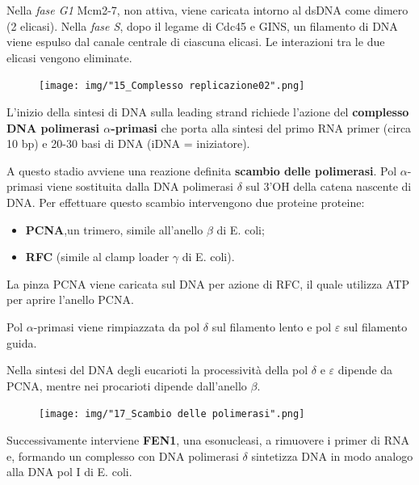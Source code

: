 \documentclass[11pt]{book}
\begin{document}
Nella \emph{fase G1} Mcm2-7, non attiva, viene caricata intorno al dsDNA
come dimero (2 elicasi). Nella \emph{fase S}, dopo il legame di Cdc45 e
GINS, un filamento di DNA viene espulso dal canale centrale di ciascuna
elicasi. Le interazioni tra le due elicasi vengono eliminate.

\begin{figure}[htp]
\centering
\texttt{[image: img/"15\_Complesso replicazione02".png]}
\caption{}
\label{complesso-replicazione02}
\end{figure}

L'inizio della sintesi di DNA sulla leading strand richiede l'azione del
\textbf{complesso DNA polimerasi \(\alpha\)-primasi} che porta alla
sintesi del primo RNA primer (circa 10 bp) e 20-30 basi di DNA (iDNA =
iniziatore).

A questo stadio avviene una reazione definita \textbf{scambio delle
polimerasi}. Pol \(\alpha\)-primasi viene sostituita dalla DNA
polimerasi \(\delta\) sul 3'OH della catena nascente di DNA. Per
effettuare questo scambio intervengono due proteine proteine:

\begin{itemize}
\itemsep1pt\parskip0pt
\item
  \textbf{PCNA},un trimero, simile all'anello \(\beta\) di E. coli;
\item
  \textbf{RFC} (simile al clamp loader \(\gamma\) di E. coli).
\end{itemize}

La pinza PCNA viene caricata sul DNA per azione di RFC, il quale
utilizza ATP per aprire l'anello PCNA.

Pol \(\alpha\)-primasi viene rimpiazzata da pol \(\delta\) sul filamento
lento e pol \(\varepsilon\) sul filamento guida.

Nella sintesi del DNA degli eucarioti la processività della pol
\(\delta\) e \(\varepsilon\) dipende da PCNA, mentre nei procarioti
dipende dall'anello \(\beta\).

\begin{figure}[htp]
\centering
\texttt{[image: img/"17\_Scambio delle polimerasi".png]}
\caption{}
\label{scambio-delle-polimerasi}
\end{figure}

\clearpage
Successivamente interviene \textbf{FEN1}, una esonucleasi, a rimuovere i
primer di RNA e, formando un complesso con DNA polimerasi \(\delta\)
sintetizza DNA in modo analogo alla DNA pol I di E. coli.
\end{document}
